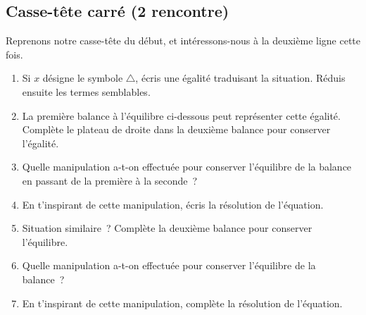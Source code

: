 \documentclass[../../syllabus_2.tex]{subfiles}
\begin{document}
\newpage
\subsection{Casse-tête carré (2\ieme{} rencontre)}

Reprenons notre casse-tête du début, et intéressons-nous à la deuxième
ligne cette fois.
\begin{center}
  
\end{center}

\begin{enumerate}
  \item
        Si $x$ désigne le symbole $\triangle$, écris une égalité traduisant la
        situation. Réduis ensuite les termes semblables.\vspace*{2cm}
  \item
        La première balance à l'équilibre ci-dessous peut représenter cette
        égalité. Complète le plateau de droite dans la deuxième balance pour
        conserver l'égalité.
        \begin{center}
          \hfil
        \end{center}
  \item
        Quelle manipulation a-t-on effectuée pour conserver l'équilibre de la
        balance en passant de la première à la seconde~?
  \item
        En t'inspirant de cette manipulation, écris la résolution de
        l'équation. \vspace*{3cm}
  \item
        Situation similaire~? Complète la deuxième balance pour conserver
        l'équilibre.
        \begin{center}
          \hfil
        \end{center}
  \item
        Quelle manipulation a-t-on effectuée pour conserver l'équilibre de la
        balance~?
  \item
        En t'inspirant de cette manipulation, complète la résolution de
        l'équation.\vspace*{3cm}
\end{enumerate}
\end{document}
